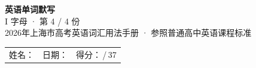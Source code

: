 \documentclass[10pt,a4paper]{article}
\begin{document}
\pagestyle{plain}

\begin{center}
{\LARGE\bfseries 英语单词默写}\\[0.22em]
{\large I 字母 · 第 4 / 4 份}\\[0.18em]
{\small 2026年上海市高考英语词汇用法手册 · 参照普通高中英语课程标准}
\end{center}

\vspace{0.25em}
\noindent\begin{tabular}{@{}p{}@{}p{}@{}p{}@{}}
姓名：\underline{\hspace{2.0cm}} & 日期：\underline{\hspace{2.0cm}} & 得分：\underline{\hspace{1.3cm}}\,/\,37 \\
\end{tabular}

\vspace{0.3em}

\vspace{0.08em}
\end{document}
